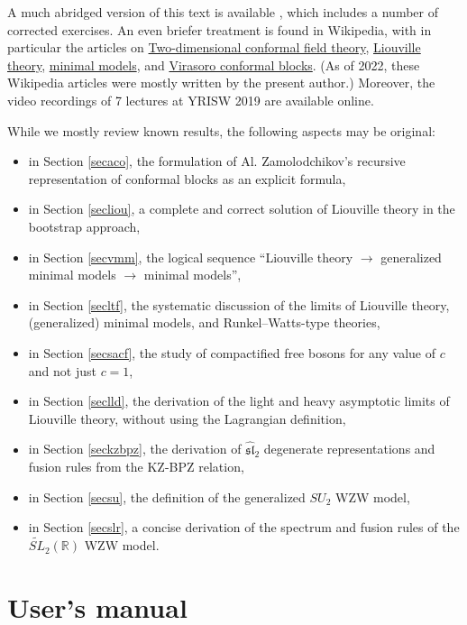 \documentclass[12pt, a4paper, notitlepage, twoside]{report}
\numberwithin{equation}{section}
\theoremstyle{break}
\begin{document}
A much abridged version of this text is available \cite{rib16}, which includes a number of corrected exercises. An even briefer treatment is found in Wikipedia, with in particular the articles on \href{https://en.wikipedia.org/wiki/Two-dimensional_conformal_field_theory}{Two-dimensional conformal field theory}, \href{https://en.wikipedia.org/wiki/Liouville_field_theory}{Liouville theory},
\href{https://en.wikipedia.org/wiki/Minimal_models}{minimal models}, and \href{https://en.wikipedia.org/wiki/Virasoro_conformal_block}{Virasoro conformal blocks}.
(As of 2022, these Wikipedia articles were mostly written by the present author.) Moreover, the video recordings of 7 lectures at YRISW 2019 are available online.

While we mostly review known results, the following aspects may be original:
\begin{itemize}
\item in Section \ref{secaco}, the formulation of Al. Zamolodchikov's recursive representation of conformal blocks as an explicit formula,
\item in Section \ref{secliou}, a complete and correct solution of Liouville theory in the bootstrap approach, 
\item in Section \ref{secvmm}, the logical sequence ``Liouville theory $\rightarrow$ generalized minimal models $\rightarrow$ minimal models'',
\item in Section \ref{secltf}, the systematic discussion of the limits of Liouville theory, (generalized) minimal models, and Runkel--Watts-type theories,
\item in Section \ref{secsacf}, the study of compactified free bosons for any value of $c$ and not just $c=1$,
\item in Section \ref{seclld}, the derivation of the light and heavy asymptotic limits of Liouville theory, without using the Lagrangian definition,
\item in Section \ref{seckzbpz}, the derivation of $\widehat{\mathfrak{sl}}_2$ degenerate representations and fusion rules from the KZ-BPZ relation,
\item in Section \ref{secsu}, the definition of the generalized $SU_2$ WZW model,
\item in Section \ref{secslr}, a concise derivation of the spectrum and fusion rules of the $\widetilde{SL}_2(\mathbb{R})$ WZW model.
\end{itemize}


\section{User's manual}
\end{document}
